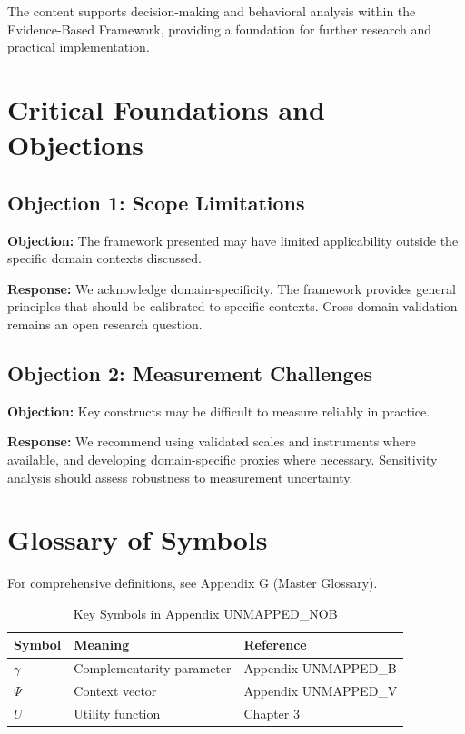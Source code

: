 The content supports decision-making and behavioral analysis within the
Evidence-Based Framework, providing a foundation for further research
and practical implementation.



\section{Critical Foundations and Objections}
\label{sec:nob-foundations}

\subsection{Objection 1: Scope Limitations}

\textbf{Objection:} The framework presented may have limited applicability
outside the specific domain contexts discussed.

\textbf{Response:} We acknowledge domain-specificity. The framework provides
general principles that should be calibrated to specific contexts. Cross-domain
validation remains an open research question.

\subsection{Objection 2: Measurement Challenges}

\textbf{Objection:} Key constructs may be difficult to measure reliably in
practice.

\textbf{Response:} We recommend using validated scales and instruments where
available, and developing domain-specific proxies where necessary. Sensitivity
analysis should assess robustness to measurement uncertainty.



\section{Glossary of Symbols}
\label{sec:nob-glossary}

For comprehensive definitions, see Appendix G (Master Glossary).

\begin{table}[htbp]
\centering
\caption{Key Symbols in Appendix UNMAPPED_NOB}
\begin{tabular}{lll}
\toprule
\textbf{Symbol} & \textbf{Meaning} & \textbf{Reference} \\
\midrule
$\gamma$ & Complementarity parameter & Appendix UNMAPPED_B \\
$\Psi$ & Context vector & Appendix UNMAPPED_V \\
$U$ & Utility function & Chapter 3 \\
\bottomrule
\end{tabular}
\end{table}


